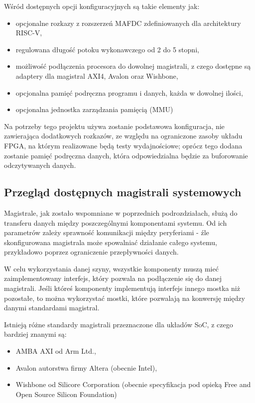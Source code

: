 Wśród dostępnych opcji konfiguracyjnych są takie elementy jak:
\begin{itemize}
	\item opcjonalne rozkazy z rozszerzeń MAFDC zdefiniowanych dla architektury RISC-V,
	\item regulowana długość potoku wykonawczego od 2 do 5 stopni,
	\item możliwość podłączenia procesora do dowolnej magistrali, z czego dostępne są adaptery dla magistral AXI4, Avalon oraz Wishbone,
	\item opcjonalna pamięć podręczna programu i danych, każda w dowolnej ilości,
	\item opcjonalna jednostka zarządzania pamięcią (MMU)
\end{itemize}

Na potrzeby tego projektu używa zostanie podstawowa konfiguracja, nie zawierająca dodatkowych rozkazów, ze względu na ograniczone zasoby układu FPGA, na którym realizowane będą testy wydajnościowe; oprócz tego dodana zostanie pamięć podręczna danych, która odpowiedzialna będzie za buforowanie odczytywanych danych.

\subsection{Przegląd dostępnych magistrali systemowych}

Magistrale, jak zostało wspomniane w poprzednich podrozdziałach, służą do transferu danych między poszczególnymi komponentami systemu. Od ich parametrów zależy sprawność komunikacji między peryferiami - źle skonfigurowana magistrala może spowalniać działanie całego systemu, przykładowo poprzez ograniczenie przepływności danych.

W celu wykorzystania danej szyny, wszystkie komponenty muszą mieć zaimplementowany interfejs, który pozwala na podłączenie się do danej magistrali. Jeśli któreś komponenty implementują interfejs innego mostka niż pozostałe, to można wykorzystać mostki, które pozwalają na konwersję między danymi standardami magistral.

Istnieją różne standardy magistrali przeznaczone dla układów SoC, z czego bardziej znanymi są:
\begin{itemize}
	\item AMBA AXI od Arm Ltd.,
	\item Avalon autorstwa firmy Altera (obecnie Intel),
	\item Wishbone od Silicore Corporation (obecnie specyfikacja pod opieką Free and Open Source Silicon Foundation)
\end{itemize}


